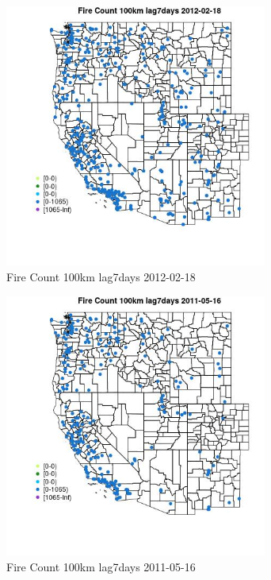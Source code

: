 \begin{figure} 
\centering  
\includegraphics[width=0.77\textwidth]{Code_Outputs/Report_ML_input_PM25_Step4_part_f_de_duplicated_aveswNAs_MapObsFire_Count_100km_lag7days2012-02-18.jpg} 
\caption{\label{fig:Report_ML_input_PM25_Step4_part_f_de_duplicated_aveswNAsMapObsFire_Count_100km_lag7days2012-02-18}Fire Count 100km lag7days 2012-02-18} 
\end{figure} 
 

\clearpage 

\begin{figure} 
\centering  
\includegraphics[width=0.77\textwidth]{Code_Outputs/Report_ML_input_PM25_Step4_part_f_de_duplicated_aveswNAs_MapObsFire_Count_100km_lag7days2011-05-16.jpg} 
\caption{\label{fig:Report_ML_input_PM25_Step4_part_f_de_duplicated_aveswNAsMapObsFire_Count_100km_lag7days2011-05-16}Fire Count 100km lag7days 2011-05-16} 
\end{figure} 
 

